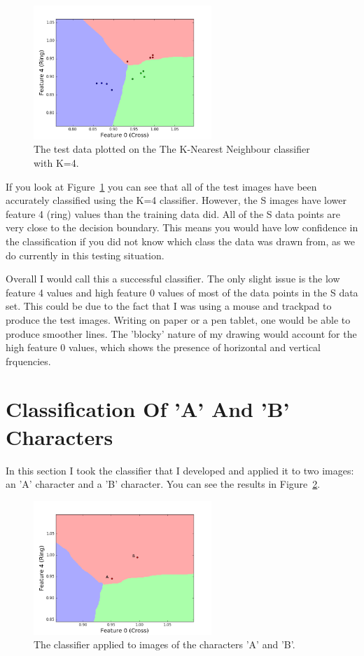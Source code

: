 \documentclass[11pt, a4paper]{article}
\begin{document}
\begin{figure}[ht]
	\centering
	\includegraphics[trim={0 0 0 1cm},clip,width=0.6\textwidth]{test_plot.png}
	\caption{The test data plotted on the The K-Nearest Neighbour classifier with K=4.}
	\label{fig:classifier_test}
\end{figure}

If you look at Figure~\ref{fig:classifier_test} you can see that all of the test images have been accurately classified using the K=4 classifier. However, the S images have lower feature 4 (ring) values than the training data did. All of the S data points are very close to the decision boundary. This means you would have low confidence in the classification if you did not know which class the data was drawn from, as we do currently in this testing situation. 

Overall I would call this a successful classifier. The only slight issue is the low feature 4 values and high feature 0 values of most of the data points in the S data set. This could be due to the fact that I was using a mouse and trackpad to produce the test images. Writing on paper or a pen tablet, one would be able to produce smoother lines. The 'blocky' nature of my drawing would account for the high feature 0 values, which shows the presence of horizontal and vertical frquencies. 

\section{Classification Of 'A' And 'B' Characters}

In this section I took the classifier that I developed and applied it to two images: an 'A' character and a 'B' character. You can see the results in Figure~\ref{fig:ab}.

\begin{figure}[h]
	\centering
	\includegraphics[trim={0 0 0 1cm},clip,width=0.6\textwidth]{ab.png}
	\caption{The classifier applied to images of the characters 'A' and 'B'.}
	\label{fig:ab}
\end{figure}
\end{document}
